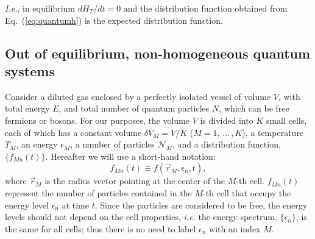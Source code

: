 \textit{I.e.}, in equilibrium $dH_T/dt=0$ and the distribution function obtained from
Eq.~(\ref{eq:quantumh}) is the expected distribution function.

\begin{comment}
In addition, Tolman also showed that (\ref{eq:quantumh}) can be reduced, in the
high-energy limit, to
%
\begin{equation}
    H_T = \sum_{\kappa} (n_{\kappa} \ln n_{\kappa} - n_{\kappa} \ln g_{\kappa}). \label{reduce-h}
\end{equation}
%
This expression also can be obtained also from the Boltzmann $H$-functional through defining
%
\begin{equation}
    f=\frac{n_{\kappa}}{ g_{\kappa}}.
\end{equation}
\end{comment}
%



\subsection{Out of equilibrium, non-homogeneous quantum systems}

Consider a diluted gas enclosed by a perfectly isolated vessel of volume $V$, with
total energy $E$, and total number of quantum particles $N$, which can be free fermions or
bosons. For our purposes, the volume $V$ is divided into $K$ small cells, each of which
has a constant volume $\delta V_M=V/K$ ($M=1,\,\dots\,,K$), a temperature $T_M$, an energy $\epsilon_M$,
a number of particles $\mathcal{N}_M$, and a distribution function,
$\{f_{Mn}(t)\}$. Hereafter we will use a short-hand notation:
%
\begin{equation}
   f_{Mn}(t)\equiv f(\vec r_M,\epsilon_{n},t),
\end{equation}
%
where $\vec r_M$ is the radius vector pointing at the center of the $M$-th cell.
$f_{Mn}(t)$ represent the number
of particles contained in the $M$-th cell that occupy the energy level $\epsilon_n$ at
time $t$. Since the particles are considered to be free, the energy levels should not
depend on the cell properties, \textit{i.e.} the energy spectrum, $\{\epsilon_n\}$, is the same for all
cells; thus there is no need to label $\epsilon_n$ with an index $M$.

